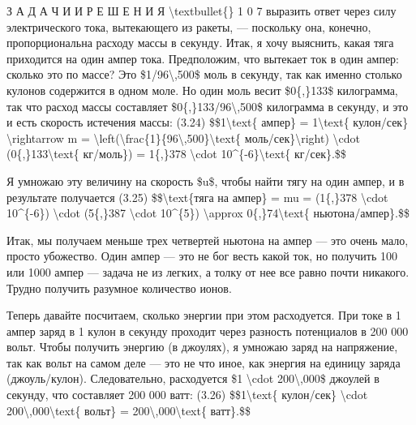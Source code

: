 \documentclass[10pt,oneside]{article}
\begin{document}
З А Д А Ч И  И  Р Е Ш Е Н И Я \textbackslash{}textbullet\{\} 1 0 7 выразить ответ через силу электрического тока, вытекающего из ракеты, --- поскольку она, конечно, пропорциональна расходу массы в секунду. Итак, я хочу выяснить, какая тяга приходится на один ампер тока. Предположим, что вытекает ток в один ампер: сколько это по массе? Это \$1/96\textbackslash{},500\$ моль в секунду, так как именно столько кулонов содержится в одном моле. Но один моль весит \$0\{,\}133\$ килограмма, так что расход массы составляет \$0\{,\}133/96\textbackslash{},500\$ килограмма в секунду, и это и есть скорость истечения массы: (3.24) \$\$1\textbackslash{}text\{ ампер\} = 1\textbackslash{}text\{ кулон/сек\} \textbackslash{}rightarrow m = \textbackslash{}left(\textbackslash{}frac\{1\}\{96\textbackslash{},500\}\textbackslash{}text\{ моль/сек\}\textbackslash{}right) \textbackslash{}cdot (0\{,\}133\textbackslash{}text\{ кг/моль\}) = 1\{,\}378 \textbackslash{}cdot 10\textasciicircum{}\{-6\}\textbackslash{}text\{ кг/сек\}.\$\$\par

Я умножаю эту величину на скорость \$u\$, чтобы найти тягу на один ампер, и в результате получается (3.25) \$\$\textbackslash{}text\{тяга на ампер\} = mu = (1\{,\}378 \textbackslash{}cdot 10\textasciicircum{}\{-6\}) \textbackslash{}cdot (5\{,\}387 \textbackslash{}cdot 10\textasciicircum{}\{5\}) \textbackslash{}approx 0\{,\}74\textbackslash{}text\{ ньютона/ампер\}.\$\$\par

Итак, мы получаем меньше трех четвертей ньютона на ампер --- это очень мало, просто убожество. Один ампер --- это не бог весть какой ток, но получить 100 или 1000 ампер --- задача не из легких, а толку от нее все равно почти никакого. Трудно получить разумное количество ионов.\par

Теперь давайте посчитаем, сколько энергии при этом расходуется. При токе в 1 ампер заряд в 1 кулон в секунду проходит через разность потенциалов в 200 000 вольт. Чтобы получить энергию (в джоулях), я умножаю заряд на напряжение, так как вольт на самом деле --- это не что иное, как энергия на единицу заряда (джоуль/кулон). Следовательно, расходуется \$1 \textbackslash{}cdot 200\textbackslash{},000\$ джоулей в секунду, что составляет 200 000 ватт: (3.26) \$\$1\textbackslash{}text\{ кулон/сек\} \textbackslash{}cdot 200\textbackslash{},000\textbackslash{}text\{ вольт\} = 200\textbackslash{},000\textbackslash{}text\{ ватт\}.\$\$\par
\end{document}
